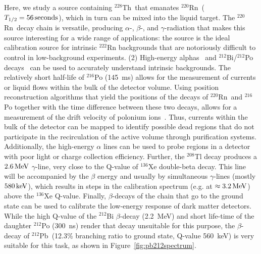 Here, we study a source containing $^{228}$Th~that emanates $^{220}$Rn~($T_{1/2}=56\,\mathrm{seconds}$), which in turn can be mixed into the liquid target. The $^{220}$Rn~decay chain is versatile, producing $\alpha$-, $\beta$-, and $\gamma$-radiation that makes this source interesting for a wide range of applications: the source is the ideal calibration source for intrinsic $^{222}$Rn backgrounds that are notoriously difficult to control in low-background experiments. (2) High-energy alphas~\cite{Albert:2015vma,Aprile:2017fhu} and $^{212}$Bi/$^{212}$Po decays~\cite{Bellini:2012qg} can be used to accurately understand intrinsic backgrounds. The relatively short half-life of $^{216}$Po (145~ms) allows for the measurement of currents or liquid flows within the bulk of the detector volume. Using position reconstruction algorithms that yield the positions of the decays of $^{220}$Rn~and $^{216}$Po together with the time difference between these two decays, allows for a measurement of the drift velocity of polonium ions~\cite{Albert:2015vma}. Thus, currents within the bulk of the detector can be mapped to identify possible dead regions that do not participate in the recirculation of the active volume through purification systems. Additionally, the high-energy $\alpha$ lines can be used to probe regions in a detector with poor light or charge collection efficiency. Further, the $^{208}$Tl decay produces a $2.6\,\mathrm{MeV}$ $\gamma$-line, very close to the Q-value of $^{136}$Xe double-beta decay. This line will be accompanied by the $\beta$ energy and usually by simultaneous $\gamma$-lines (mostly $580\,\mathrm{keV}$), which results in steps in the calibration spectrum (e.g. at $\approx 3.2\,\mathrm{MeV}$) above the $^{136}$Xe Q-value. Finally, $\beta$-decays of the chain that go to the ground state can be used to calibrate the low-energy response of dark matter detectors. While the high Q-value of the $^{212}$Bi $\beta$-decay (2.2~MeV) and short life-time of the daughter $^{212}$Po (300~ns) render that decay unsuitable for this purpose, the $\beta$-decay of $^{212}$Pb~(12.3\% branching ratio to ground state, Q-value 560~keV) is very suitable for this task, as shown in Figure~\ref{fig:pb212spectrum}.

